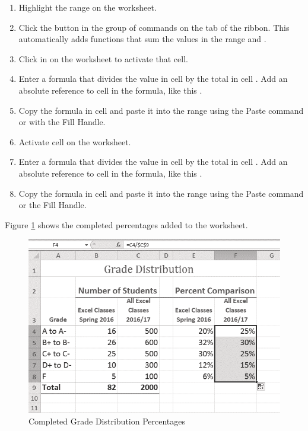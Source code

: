 \begin{enumerate}
	\item Highlight the range  on the  worksheet.
	\item Click the  button in the  group of commands on the  tab of the ribbon. This automatically adds  functions that sum the values in the range  and .
	\item Click in  on the  worksheet to activate that cell.
	\item Enter a formula that divides the value in cell  by the total in cell . Add an absolute reference to cell  in the formula, like this .
	\item Copy the formula in cell  and paste it into the range  using the Paste command or with the Fill Handle.
	\item Activate cell  on the  worksheet.
	\item Enter a formula that divides the value in cell  by the total in cell . Add an absolute reference to cell  in the formula, like this .
	\item Copy the formula in cell  and paste it into the range  using the Paste command or the Fill Handle.
\end{enumerate}

Figure \ref{04:fig16} shows the completed percentages added to the  worksheet.

\begin{figure}[H]
	\centering
	\includegraphics[width=\maxwidth{.95\linewidth}]{gfx/ch04_fig16}
	\caption{Completed Grade Distribution Percentages}
	\label{04:fig16}
\end{figure}


